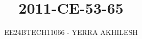 \documentclass[journal]{IEEEtran}
\begin{document}

\vspace{3cm}

\title{2011-CE-53-65}
\author{EE24BTECH11066 - YERRA AKHILESH
}
{\let\newpage\relax\maketitle}

\renewcommand{\thefigure}{\theenumi}
\renewcommand{\thetable}{\theenumi}
\setlength{\intextsep}{10pt} %


\renewcommand{\thetable}{\theenumi}
\end{document}
